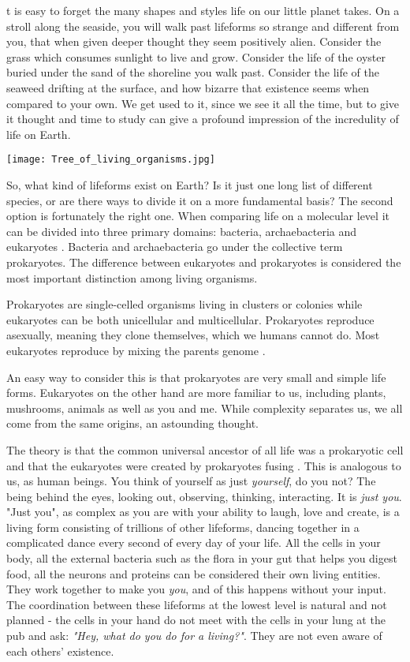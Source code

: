 t is easy to forget the many shapes and styles life on our little planet takes.
On a stroll along the seaside, you will walk past lifeforms so strange and different from you, that when given deeper thought they seem positively alien.
Consider the grass which consumes sunlight to live and grow.
Consider the life of the oyster buried under the sand of the shoreline you walk past.
Consider the life of the seaweed drifting at the surface, and how bizarre that existence seems when compared to your own.
We get used to it, since we see it all the time, but to give it thought and time to study can give a profound impression of the incredulity of life on Earth.

\begin{center}
	\texttt{[image: Tree\_of\_living\_organisms.jpg]}
\end{center}

So, what kind of lifeforms exist on Earth?
Is it just one long list of different species, or are there ways to divide it on a more fundamental basis?
The second option is fortunately the right one.
When comparing life on a molecular level it can be divided into three primary domains: bacteria, archaebacteria and eukaryotes \cite{Eukaryotes}.
Bacteria and archaebacteria go under the collective term prokaryotes.
The difference between eukaryotes and prokaryotes is considered the most important distinction among living organisms.

Prokaryotes are single-celled organisms living in clusters or colonies while eukaryotes can be both unicellular and multicellular.
Prokaryotes reproduce asexually, meaning they clone themselves, which we humans cannot do.
Most eukaryotes reproduce by mixing the parents genome \cite{ProcaEuka}. 

An easy way to consider this is that prokaryotes are very small and simple life forms.
Eukaryotes on the other hand are more familiar to us, including plants, mushrooms, animals as well as you and me.
While complexity separates us, we all come from the same origins, an astounding thought.

The theory is that the common universal ancestor of all life was a prokaryotic cell and that the eukaryotes were created by prokaryotes fusing \cite{ProcaEuka}.
This is analogous to us, as human beings.
You think of yourself as just \textit {yourself}, do you not?
The being behind the eyes, looking out, observing, thinking, interacting.
It is \textit{just you}.
"Just you", as complex as you are with your ability to laugh, love and create, is a living form consisting of trillions of other lifeforms, dancing together in a complicated dance every second of every day of your life.
All the cells in your body, all the external bacteria such as the flora in your gut that helps you digest food, all the neurons and proteins can be considered their own living entities.
They work together to make you \textit{you}, and of this happens without your input.
The coordination between these lifeforms at the lowest level is natural and not planned - the cells in your hand do not meet with the cells in your lung at the pub and ask: \emph{"Hey, what do you do for a living?"}.
They are not even aware of each others' existence.


